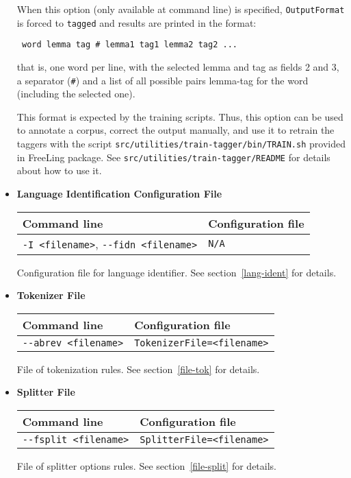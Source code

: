 \documentclass[a4paper]{book}
\begin{document}
\begin{itemize}
  When this option (only available at command line) is specified,
  \verb#OutputFormat# is forced to \verb#tagged# and results are
  printed in the format:
\begin{verbatim}
 word lemma tag # lemma1 tag1 lemma2 tag2 ...
\end{verbatim}
that is, one word per line, with the selected lemma and tag as fields
2 and 3, a separator (\verb/#/) and a list of all possible pairs
lemma-tag for the word (including the selected one).

 This format is expected by the training scripts. Thus, this option can
 be used to annotate a corpus, correct the output manually, and use it
 to retrain the taggers with the script {\tt src/utilities/train-tagger/bin/TRAIN.sh}
 provided in FreeLing package. See {\tt src/utilities/train-tagger/README} for
 details about how to use it.
  
\item {\bf Language Identification Configuration File}

\begin{tabular}{|l|l|}
Command line       & Configuration file   \\ \hline
\verb#-I <filename>#, \verb#--fidn <filename># & \verb#N/A#  \\ \hline
\end{tabular}

  Configuration file for language identifier. See section~\ref{lang-ident} for details.


\item {\bf Tokenizer File}

\begin{tabular}{|l|l|}
Command line       & Configuration file   \\ \hline
\verb#--abrev <filename># & \verb#TokenizerFile=<filename>#  \\ \hline
\end{tabular}

  File of tokenization rules. See section~\ref{file-tok} for details.

\item {\bf Splitter File}

\begin{tabular}{|l|l|}
Command line       & Configuration file   \\ \hline
\verb#--fsplit <filename># & \verb#SplitterFile=<filename>#  \\ \hline
\end{tabular}

  File of splitter options rules. See section~\ref{file-split} for details.


\end{itemize}
\end{document}
